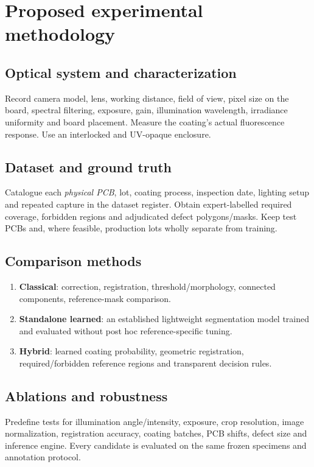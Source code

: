 \section{Proposed experimental methodology}

\subsection{Optical system and characterization}
Record camera model, lens, working distance, field of view, pixel size on the
board, spectral filtering, exposure, gain, illumination wavelength, irradiance
uniformity and board placement. Measure the coating's actual fluorescence response.
Use an interlocked and UV-opaque enclosure.

\subsection{Dataset and ground truth}
Catalogue each \emph{physical PCB}, lot, coating process, inspection date,
lighting setup and repeated capture in the dataset register. Obtain expert-labelled
required coverage, forbidden regions and adjudicated defect polygons/masks. Keep
test PCBs and, where feasible, production lots wholly separate from training.

\subsection{Comparison methods}
\begin{enumerate}
\item \textbf{Classical}: correction, registration, threshold/morphology,
connected components, reference-mask comparison.
\item \textbf{Standalone learned}: an established lightweight segmentation
model trained and evaluated without post hoc reference-specific tuning.
\item \textbf{Hybrid}: learned coating probability, geometric registration,
required/forbidden reference regions and transparent decision rules.
\end{enumerate}

\subsection{Ablations and robustness}
Predefine tests for illumination angle/intensity, exposure, crop resolution,
image normalization, registration accuracy, coating batches, PCB shifts,
defect size and inference engine. Every candidate is evaluated on the same
frozen specimens and annotation protocol.

